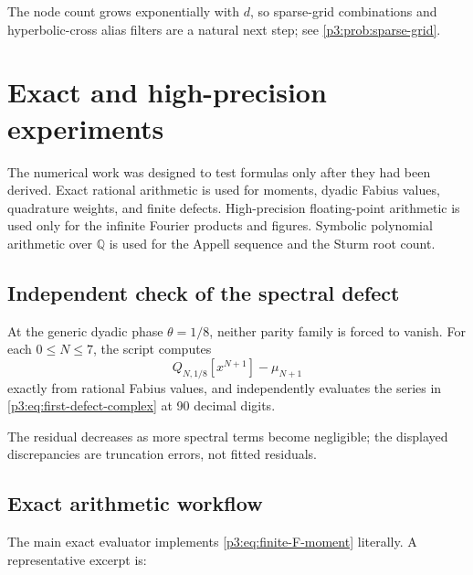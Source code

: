 \documentclass[11pt,oneside]{article}
\numberwithin{equation}{section}
\theoremstyle{definition}
\theoremstyle{remark}
\newcommand{\Q}{\mathbb Q}
\begin{document}
The node count grows exponentially with $d$, so sparse-grid combinations and hyperbolic-cross alias filters are a natural next step; see \cref{p3:prob:sparse-grid}.

\section{Exact and high-precision experiments}
\label{p3:sec:experiments}

The numerical work was designed to test formulas only after they had been derived.  Exact rational arithmetic is used for moments, dyadic Fabius values, quadrature weights, and finite defects.  High-precision floating-point arithmetic is used only for the infinite Fourier products and figures.  Symbolic polynomial arithmetic over $\Q$ is used for the Appell sequence and the Sturm root count.

\subsection{Independent check of the spectral defect}

At the generic dyadic phase $\theta=1/8$, neither parity family is forced to vanish.  For each $0\le N\le7$, the script computes
\[
 Q_{N,1/8}[x^{N+1}]-\mu_{N+1}
\]
exactly from rational Fabius values, and independently evaluates the series in \eqref{p3:eq:first-defect-complex} at 90 decimal digits.

\begin{table}[H]
\centering
\caption{Independent exact-versus-spectral verification at $\theta=1/8$.  The first numerical column is obtained from exact rational arithmetic and displayed decimally; the full fractions are retained in the archive.}
\label{p3:tab:spectral-check}

\end{table}

The residual decreases as more spectral terms become negligible; the displayed discrepancies are truncation errors, not fitted residuals.

\subsection{Exact arithmetic workflow}

The main exact evaluator implements \eqref{p3:eq:finite-F-moment} literally.  A representative excerpt is:
\end{document}
